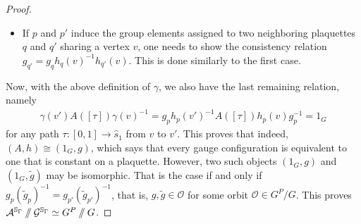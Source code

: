 \documentclass[10pt,a4paper]{amsart}
\newcommand{\sslash}{\mathbin{/\mkern-6mu/}}
\numberwithin{equation}{section}
\theoremstyle{definition}
\begin{document}
\begin{proof}
\begin{itemize}
 Choose a sequence of plaquettes $p = p_0, \dots, p_{\ell} = p'$, forming a path in the connected graph $\Gamma^*$ with $p_i$ and $p_{i+1}$ sharing the vertex $v_{i+1}$, and choose paths $\delta_i\colon [0,1] \rightarrow \hat{p_i}$ starting at $v_i$ and ending at $v_{i+1}$. Here, our notation is such that $v_0 = v$ and $v_{\ell+1} = v'$. Since $A([\delta_i])h_{p_i}(v_i) = h_{p_i}(v_{i+1})$, the relations imply that setting $\delta = \delta_{\ell} \star \dots \star \delta_0$ gives the desired path. As $\pi_1\left(\hat{s}_1\right)$ is trivial, the path $\delta$ is homotopy equivalent relative to its endpoints to a~path in $\mathrm{cl}(q)$ that lifts to a~path $\sigma$ with $\mathrm{im} (\sigma) \subset \hat{q}$ and $A([\sigma])h_q(v) = h_q(v')$. We find
 \begin{align*}
 g_q = g_{p'}h_{p'}(v')^{-1}A([\delta])h_{q}(v) = g_{p'}h_{p'}(v')^{-1}A([\sigma])h_{q}(v) = g_{p'}h_{p'}(v')^{-1}h_{q}(v'),
 \end{align*}
 showing that both $p$ and $p'$ induce the same group element for $q$.
 \item If $p$ and $p'$ induce the group elements assigned to two neighboring plaquettes $q$ and $q'$ sharing a vertex $v$, one needs to show the consistency relation $g_{q'} = g_q h_q(v)^{-1}h_{q'}(v)$. This is done similarly to the first case.
\end{itemize}
Now, with the above definition of $\gamma$, we also have the last remaining relation, namely
\begin{align*}
 \gamma(v')A([\tau])\gamma(v)^{-1} = g_ph_p(v')^{-1}A([\tau])h_p(v)g_p^{-1} = 1_G
\end{align*}
for any path $\tau\colon [0,1] \rightarrow \hat{s}_1$ from $v$ to $v'$. This proves that indeed, $(A,h) \cong (1_G, g)$, which says that every gauge configuration is equivalent to one that is constant on a plaquette. However, two such objects $(1_G, g)$ and $(1_G, \widetilde{g})$ may be isomorphic. That is the case if and only if $g_p(\widetilde{g}_{p})^{-1} = g_{p'}(\widetilde{g}_{p'})^{-1}$, that is, $g, \widetilde{g} \in \mathcal{O}$ for some orbit $\mathcal{O} \in G^P/G$. This proves $\mathcal{A}^{\mathbb{S}_{\Gamma}} \sslash \mathcal{G}^{\mathbb{S}_{\Gamma}} \simeq G^P \sslash G$.


\end{proof}
\end{document}
